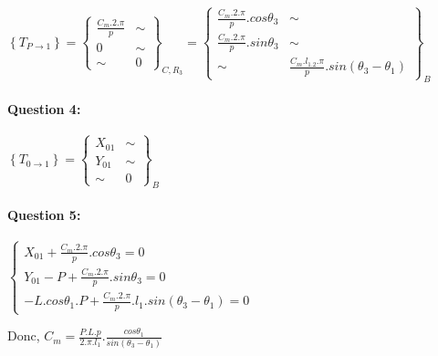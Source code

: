 $\left\{T_{P\rightarrow 1}\right\}=\left\{\begin{array}{cc}
\frac{C_m.2.\pi}{p} & \sim \\
0 & \sim \\
\sim & 0
\end{array}\right\}_{C,R_3}=\left\{\begin{array}{cc}
\frac{C_m.2.\pi}{p}.cos\theta_3 & \sim \\
\frac{C_m.2.\pi}{p}.sin\theta_3 & \sim \\
\sim & \frac{C_m.l_1.2.\pi}{p}.sin(\theta_3-\theta_1)
\end{array}\right\}_B$

\paragraph{Question 4:}

$\left\{T_{0\rightarrow 1}\right\}=\left\{\begin{array}{cc}
X_{01} & \sim \\
Y_{01} & \sim \\
\sim & 0
\end{array}\right\}_B$

\paragraph{Question 5:}

$\left\{\begin{array}{l}
X_{01}+\frac{C_m.2.\pi}{p}.cos\theta_3=0 \\
Y_{01}-P+\frac{C_m.2.\pi}{p}.sin\theta_3=0 \\
-L.cos\theta_1.P+\frac{C_m.2.\pi}{p}.l_1.sin(\theta_3-\theta_1)=0
\end{array}\right.$

Donc, $C_m=\frac{P.L.p}{2.\pi.l_1}.\frac{cos\theta_1}{sin(\theta_3-\theta_1)}$


